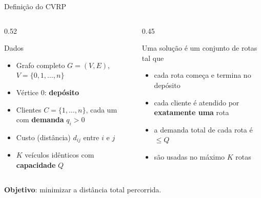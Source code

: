 \documentclass[aspectratio=169,xcolor=table]{beamer}
\begin{document}
\begin{frame}{Definição do CVRP \cite{dantzig1959truck,uchoa2017x}}
  \begin{columns}[T]
    \begin{column}{0.52\textwidth}
      \begin{block}{Dados}
        \begin{itemize}
          \item Grafo completo $G = (V, E)$, $V = \{0, 1, \dots, n\}$
          \item Vértice $0$: \textbf{depósito}
          \item Clientes $C = \{1, \dots, n\}$, cada um com \textbf{demanda} $q_i > 0$
          \item Custo (distância) $d_{ij}$ entre $i$ e $j$
          \item $K$ veículos idênticos com \textbf{capacidade} $Q$
        \end{itemize}
      \end{block}
    \end{column}
    \begin{column}{0.45\textwidth}
      \begin{block}{Uma solução é um conjunto de rotas tal que}
        \begin{itemize}
          \item cada rota começa e termina no depósito
          \item cada cliente é atendido por \textbf{exatamente uma} rota
          \item a demanda total de cada rota é $\le Q$
          \item são usadas no máximo $K$ rotas
        \end{itemize}
      \end{block}
    \end{column}
  \end{columns}
  \vspace{0.5em}
  \begin{center}
    \textbf{Objetivo}: minimizar a distância total percorrida.\\
  \end{center}
\end{frame}
\end{document}

